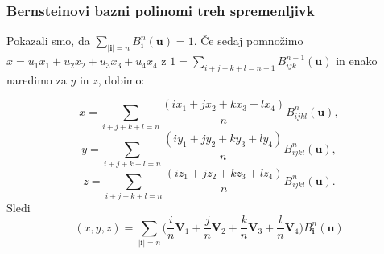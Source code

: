 \documentclass[10pt]{beamer}
\theoremstyle{definition}
\begin{document}
  \begin{frame}

    \frametitle{Bernsteinovi bazni polinomi treh spremenljivk}
    Pokazali smo, da $\sum_{|\textbf{i}|=n}B_{\textbf{i}}^n(\textbf{u})=1$.\pause    
    Če sedaj pomnožimo $x=u_1x_1+u_2x_2+u_3x_3+u_4x_4$ z
    $1 = \sum_{i+j+k+l=n-1}B_{ijk}^{n-1}(\textbf{u})$ in enako naredimo za 
    $y$ in $z$, dobimo:\pause

    $$
    x = \sum_{i+j+k+l=n}\frac{(ix_1+jx_2+kx_3+lx_4)}{n}B_{ijkl}^n(\textbf{u}),
    $$\pause
    $$
    y = \sum_{i+j+k+l=n}\frac{(iy_1+jy_2+ky_3+ly_4)}{n}B_{ijkl}^n(\textbf{u}),
    $$\pause
    $$
    z = \sum_{i+j+k+l=n}\frac{(iz_1+jz_2+kz_3+lz_4)}{n}B_{ijkl}^n(\textbf{u}).
    $$\pause
    Sledi $$(x,y,z) = \sum_{|\textbf{i}| = n}\bigl(\frac{i}{n}\textbf{V}_1+\frac{j}{n}\textbf{V}_2+\frac{k}{n}\textbf{V}_3+\frac{l}{n}\textbf{V}_4\bigr)B_{\textbf{i}}^n(\textbf{u})$$
\end{frame}

\end{document}
